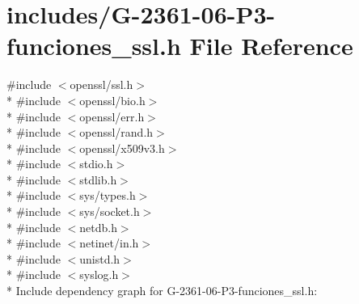 \hypertarget{_g-2361-06-_p3-funciones__ssl_8h}{}\section{includes/\+G-\/2361-\/06-\/\+P3-\/funciones\+\_\+ssl.h File Reference}
\label{_g-2361-06-_p3-funciones__ssl_8h}
{\ttfamily \#include $<$openssl/ssl.\+h$>$}\\*
{\ttfamily \#include $<$openssl/bio.\+h$>$}\\*
{\ttfamily \#include $<$openssl/err.\+h$>$}\\*
{\ttfamily \#include $<$openssl/rand.\+h$>$}\\*
{\ttfamily \#include $<$openssl/x509v3.\+h$>$}\\*
{\ttfamily \#include $<$stdio.\+h$>$}\\*
{\ttfamily \#include $<$stdlib.\+h$>$}\\*
{\ttfamily \#include $<$sys/types.\+h$>$}\\*
{\ttfamily \#include $<$sys/socket.\+h$>$}\\*
{\ttfamily \#include $<$netdb.\+h$>$}\\*
{\ttfamily \#include $<$netinet/in.\+h$>$}\\*
{\ttfamily \#include $<$unistd.\+h$>$}\\*
{\ttfamily \#include $<$syslog.\+h$>$}\\*
Include dependency graph for G-\/2361-\/06-\/\+P3-\/funciones\+\_\+ssl.h\+:
